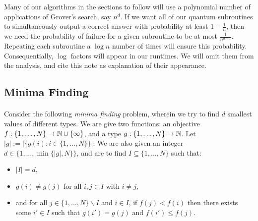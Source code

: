 \begin{note}\label{note:log}
Many of our algorithms in the sections to follow will use a polynomial number of applications of Grover's search, say $n^d$. If we want all of our quantum subroutines to simultaneously output a correct answer with probability at least $1-\frac{1}{n}$, then we need the probability of failure for a given subroutine to be at most $\frac{1}{n^{d+1}}$. Repeating each subroutine a $\log n$ number of times will ensure this probability. Consequentially, $\log $ factors will appear in our runtimes. We will omit them from the analysis, and cite this note as explanation of their appearance.
\end{note}
\subsection{Minima Finding}
\paragraph{}
Consider the following {\it minima finding } problem, wherein we try to find $d$ smallest values of different types. We are give two functions: an objective $f: \{1, \dots, N\} \rightarrow \mathbb{N} \cup \{\infty\}$, and a type $g: \{1, \dots, N\} \rightarrow \mathbb{N}$. Let $|g| := | \{ g(i): i \in \{1,\dots, N\}\}|$. We are also given an integer $d \in \{1, \dots, \min\{|g|, N\}\}$, and are to find $I \subseteq \{1, \dots, N\}$ such that:
\begin{itemize}
\item $|I| = d$,
\item $g(i) \neq g(j)$ for all $i,j \in I$ with $i\neq j$,
\item and for all $j \in \{1,\dots, N\}\backslash I$ and $i \in I$, if $f(j) < f(i)$ then there exists some $i' \in I$ such that $g(i') = g(j)$ and $f(i') \leq f(j)$.
\end{itemize}
